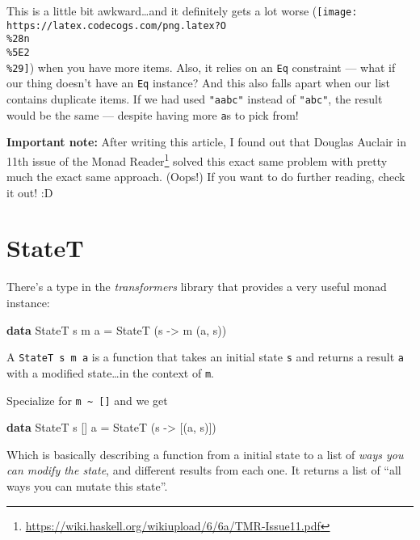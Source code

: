 \documentclass[]{article}
\newenvironment{Shaded}{}{}
\newcommand{\DataTypeTok}[1]{\textcolor[rgb]{0.56,0.13,0.00}{#1}}
\newcommand{\FunctionTok}[1]{\textcolor[rgb]{0.02,0.16,0.49}{#1}}
\newcommand{\KeywordTok}[1]{\textcolor[rgb]{0.00,0.44,0.13}{\textbf{#1}}}
\newcommand{\NormalTok}[1]{#1}
\newcommand{\OtherTok}[1]{\textcolor[rgb]{0.00,0.44,0.13}{#1}}
\renewcommand{\href}[2]{#2\footnote{\url{#1}}}
\begin{document}
This is a little bit awkward\ldots{}and it definitely gets a lot worse
(\texttt{[image: https://latex.codecogs.com/png.latex?O\\\%28n\\\%5E2\\\%29]}) when
you have more items. Also, it relies on an \texttt{Eq} constraint --- what if
our thing doesn't have an \texttt{Eq} instance? And this also falls apart when
our list contains duplicate items. If we had used \texttt{"aabc"} instead of
\texttt{"abc"}, the result would be the same --- despite having more
\texttt{\textquotesingle{}a\textquotesingle{}}s to pick from!

\textbf{Important note:} After writing this article, I found out that Douglas
Auclair in \href{https://wiki.haskell.org/wikiupload/6/6a/TMR-Issue11.pdf}{11th
issue of the Monad Reader} solved this exact same problem with pretty much the
exact same approach. (Oops!) If you want to do further reading, check it out! :D

\hypertarget{statet}{%
\section{StateT}\label{statet}}

There's a type in the \emph{transformers} library that provides a very useful
monad instance:

\begin{Shaded}
\begin{Highlighting}[]
\KeywordTok{data} \DataTypeTok{StateT}\NormalTok{ s m a }\FunctionTok{=} \DataTypeTok{StateT}\NormalTok{ (s }\OtherTok{->}\NormalTok{ m (a, s))}
\end{Highlighting}
\end{Shaded}

A \texttt{StateT\ s\ m\ a} is a function that takes an initial state \texttt{s}
and returns a result \texttt{a} with a modified state\ldots{}in the context of
\texttt{m}.

Specialize for \texttt{m\ \textasciitilde{}\ {[}{]}} and we get

\begin{Shaded}
\begin{Highlighting}[]
\KeywordTok{data} \DataTypeTok{StateT}\NormalTok{ s [] a }\FunctionTok{=} \DataTypeTok{StateT}\NormalTok{ (s }\OtherTok{->}\NormalTok{ [(a, s)])}
\end{Highlighting}
\end{Shaded}

Which is basically describing a function from a initial state to a list of
\emph{ways you can modify the state}, and different results from each one. It
returns a list of ``all ways you can mutate this state''.
\end{document}
